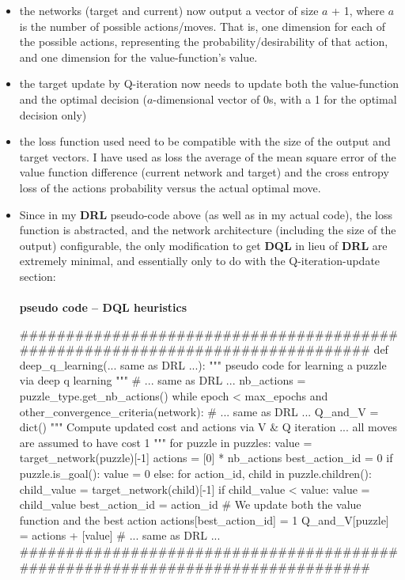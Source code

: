 \begin{itemize}
\item the networks (target and current) now output a vector of size $a$ + 1, where $a$ is the number of possible actions/moves. That is, one dimension for each of the possible actions, representing the probability/desirability of that action, and one dimension for the value-function's value.
\item the target update by Q-iteration now needs to update both the value-function and the optimal decision ($a$-dimensional vector of 0s, with a 1 for the optimal decision only)
\item the loss function used need to be compatible with the size of the output and target vectors. I have used as loss the average of the mean square error of the value function difference (current network and target) and the cross entropy loss of the actions probability versus the actual optimal move.
\item
Since in my \textbf{DRL} pseudo-code above (as well as in my actual code), the loss function is abstracted, and the network architecture (including the size of the output) configurable, the only modification to get \textbf{DQL} in lieu of \textbf{DRL} are extremely minimal, and essentially only to do with the Q-iteration-update section:


\afblue
\paragraph{}{\textbf{pseudo code -- \textbf{DQL} heuristics}}
\begin{python}
###############################################################################
def deep_q_learning(... same as DRL ...):
    """ pseudo code for learning a puzzle via deep q learning """
    # ... same as DRL ...
    nb_actions = puzzle_type.get_nb_actions()
    while epoch < max_epochs and other_convergence_criteria(network):
        # ... same as DRL ...
        Q_and_V = dict()
        """ Compute updated cost and actions via V & Q iteration ... 
             all moves are assumed to have cost 1 """
        for puzzle in puzzles:
            value = target_network(puzzle)[-1]
            actions = [0] * nb_actions
            best_action_id = 0
            if puzzle.is_goal():
                value = 0
            else:
                for action_id, child in puzzle.children():
                    child_value = target_network(child)[-1]
                    if child_value < value:
                        value = child_value
                        best_action_id = action_id
            # We update both the value function and the best action
            actions[best_action_id] = 1
            Q_and_V[puzzle] = actions + [value]
        # ... same as DRL ...
###############################################################################
\end{python}
\black


\end{itemize}
